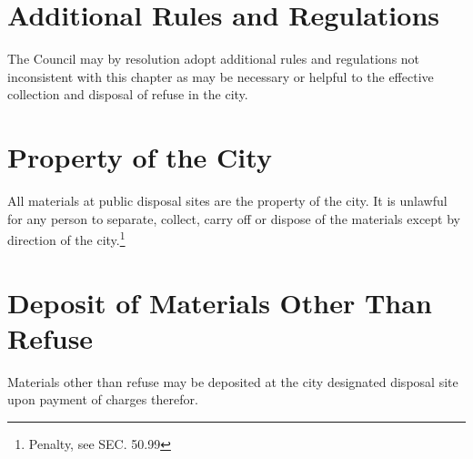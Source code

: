 \section{Additional Rules and Regulations}
The Council may by resolution adopt additional rules and regulations not inconsistent with this chapter as may be necessary or helpful to the effective collection and disposal of refuse in the city.

\section{Property of the City}
All materials at public disposal sites are the property of the city.  It is unlawful for any person to separate, collect, carry off or dispose of the materials except by direction of the city.\footnote{Penalty, see SEC. 50.99}

\section{Deposit of Materials Other Than Refuse}
Materials other than refuse may be deposited at the city designated disposal site upon payment of charges therefor.
